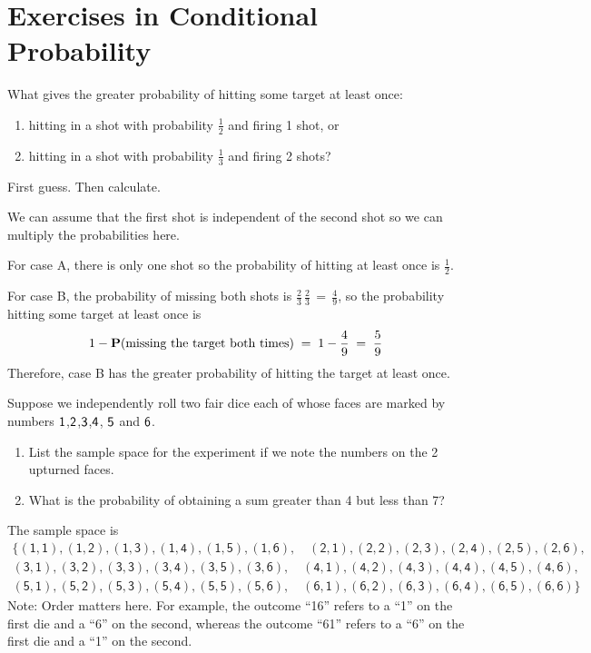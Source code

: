 \section{Exercises in Conditional Probability}\label{S:xsCondProb}

\begin{ExerciseList}

\Exercise
What gives the greater probability of hitting some target at least
  once: 
\begin{enumerate}
\item  hitting in a shot with probability $\frac{1}{2}$ and firing 1 shot, or 
\item hitting in a shot with probability $\frac{1}{3}$ and firing 2 shots?
\end{enumerate}
First guess. Then calculate.

\Answer
We can assume  that the first shot is independent of
the second shot so we can multiply the probabilities here.

For case A, there is only one shot so the probability of hitting at least once is $\frac{1}{2}$.

For case B, the probability of missing both shots is
$\frac{2}{3}\,\frac{2}{3}\,=\,\frac{4}{9}$,  so  the probability hitting some target at least once is
  \[ 1- \mathbf{P}(\text{missing the target both times})\;=\; 1-\frac{4}{9}\;=\;\frac{5}{9}\]
Therefore, case B has the greater probability of hitting the target at least once.

\Exercise
Suppose we independently roll two fair dice each of whose faces are marked by numbers
  $\sf 1$,$\sf 2$,$\sf 3$,$\sf 4$, $\sf 5$ and $\sf 6$.
\begin{enumerate}
\item List the sample space for the experiment if we note the   numbers
  on the 2 upturned faces.
\item What is the probability of obtaining a sum greater than 4 but less
  than 7?
\end{enumerate}

\Answer
\be
\item The sample space is
$$
\begin{aligned}
\{
\mathsf{(1,1),(1,2),(1,3),(1,4),(1,5),(1,6),\quad (2,1),(2,2),(2,3),(2,4),(2,5),(2,6),}\\
\mathsf{(3,1),(3,2),(3,3),(3,4),(3,5),(3,6),\quad (4,1),(4,2),(4,3),(4,4),(4,5),(4,6),}\\
\mathsf{(5,1),(5,2),(5,3),(5,4),(5,5),(5,6),\quad (6,1),(6,2),(6,3),(6,4),(6,5),(6,6)}
\}
\end{aligned}
$$
Note: Order matters here. For example, the outcome ``16'' refers to a ``1'' on the first die and a ``6'' on the second,
whereas the outcome ``61'' refers to a ``6'' on the first die and a ``1'' on the
second.


\end{ExerciseList}
